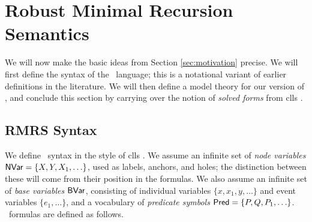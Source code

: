 \section{Robust Minimal Recursion Semantics}
\label{sec:rmrs}

We will now make the basic ideas from Section \ref{sec:motivation}
precise.  We will first define the syntax of the \rmrs\ language; this
is a notational variant of earlier definitions in the literature.  We
will then define a model theory for our version of \rmrs, and conclude
this section by carrying over the notion of \emph{solved forms} from
{\sc clls} \cite{egg:etal:2001}.



\subsection{RMRS Syntax}

We define \rmrs\ syntax in the style of {\sc clls}
\cite{egg:etal:2001}.  We assume an infinite set of {\em node
  variables} $\mathsf{NVar}=\{X,Y,X_1,\ldots\}$, used as labels, anchors, and
holes; the distinction between these will come from their
position in the formulas.  We also assume an infinite set of
\emph{base variables} $\mathsf{BVar}$, consisting of individual variables
$\{x,x_1,y,\ldots\}$ and event variables $\{e_1,\ldots\}$, and a
vocabulary of \emph{predicate symbols}
$\mathsf{Pred}=\{P,Q,P_1,\ldots\}$.
\rmrs\ formulas are defined as follows.

